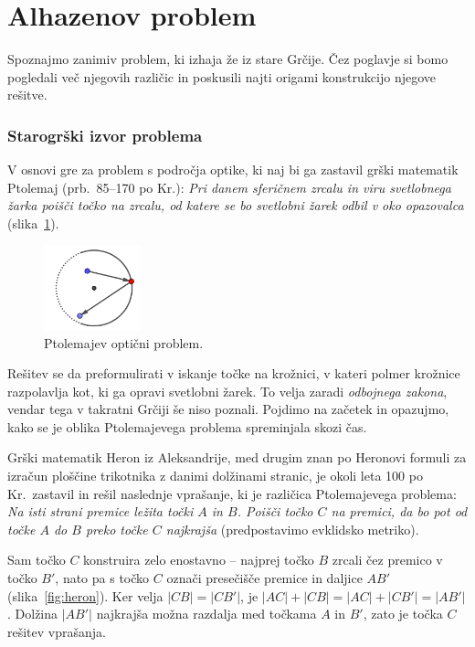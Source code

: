 \section{Alhazenov problem}

Spoznajmo zanimiv problem, ki izhaja že iz stare Grčije. Čez poglavje si bomo pogledali več njegovih različic in poskusili najti origami konstrukcijo njegove rešitve.

\subsubsection*{Starogrški izvor problema}

V osnovi gre za problem s področja optike, ki naj bi ga zastavil grški matematik Ptolemaj (prb.\ 85--170 po Kr.): \emph{Pri danem sferičnem zrcalu in viru svetlobnega žarka poišči točko na zrcalu, od katere se bo svetlobni žarek odbil v oko opazovalca} (slika~\ref{fig:ptolemaj}).

\begin{figure}[h]
    \centering
    \includegraphics[width=0.25\textwidth]{images/alhazen/ptolemajev_problem.png}
    \caption[Ptolemajev problem]{Ptolemajev optični problem.}
    \label{fig:ptolemaj}
\end{figure}

Rešitev se da preformulirati v iskanje točke na krožnici, v kateri polmer krožnice razpolavlja kot, ki ga opravi svetlobni žarek. To velja zaradi \emph{odbojnega zakona}, vendar tega v takratni Grčiji še niso poznali. Pojdimo na začetek in opazujmo, kako se je oblika Ptolemajevega problema spreminjala skozi čas.

Grški matematik Heron iz Aleksandrije, med drugim znan po Heronovi formuli za izračun ploščine trikotnika z danimi dolžinami stranic, je okoli leta 100 po Kr.\ zastavil in rešil naslednje vprašanje, ki je različica Ptolemajevega problema: \emph{Na isti strani premice ležita točki $A$ in $B$. Poišči točko $C$ na premici, da bo pot od točke $A$ do $B$ preko točke $C$ najkrajša} (predpostavimo evklidsko metriko).

Sam točko $C$ konstruira zelo enostavno -- najprej točko $B$ zrcali čez premico v točko $B'$, nato pa s točko $C$ označi presečišče premice in daljice $AB'$ (slika~\ref{fig:heron}). Ker velja $|CB| = |CB'|$, je $|AC| + |CB| = |AC| + |CB'| = |AB'|$. Dolžina $|AB'|$ najkrajša možna razdalja med točkama $A$ in $B'$, zato je točka $C$ rešitev vprašanja.

